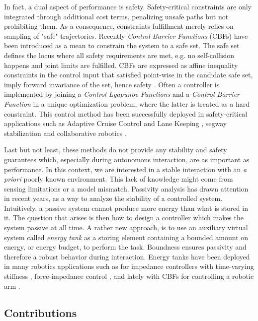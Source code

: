 In fact, a dual aspect of performance is safety. Safety-critical constraints are only integrated through additional cost terms, penalizing unsafe paths but not prohibiting them. As a consequence, constraints fulfillment merely relies on sampling of "safe" trajectories. 
Recently \emph{Control Barrier Functions} (CBFs) have been introduced as a mean to constrain the system to a safe set. The safe set defines the locus where all safety requirements are met, e.g. no self-collision happens and joint limits are fulfilled. CBFs are expressed as affine inequality constraints in the control input that satisfied point-wise in the candidate safe set, imply forward invariance of the set, hence safety \cite{ames2016control}.  Often a controller is implemented by joining a \emph{Control Lyapunov Functions} and a \emph{Control Barrier Function} in a unique optimization problem, where the latter is treated as a hard constraint. This control method has been successfully deployed in safety-critical applications such as Adaptive Cruise Control and Lane Keeping \cite{vahidi2003research}, segway stabilization \cite{gurriet2018towards} and collaborative robotics \cite{benzi2021optimization}.

Last but not least, these methods do not provide any stability and safety guarantees which, especially during autonomous interaction, are as important as performance. In this context, we are interested in a stable interaction with an \emph{a priori} poorly known environment. This lack of knowledge might come from sensing limitations or a model mismatch. Passivity analysis has drawn attention in recent years, as a way to analyze the stability of a controlled system. Intuitively, a passive system cannot produce more energy than what is stored in it. The question that arises is then how to design a controller which makes the system passive at all time. A rather new approach, is to use an auxiliary virtual system called \emph{energy tank} as a storing element containing a bounded amount on energy, or energy budget, to perform the task. Boundness ensures passivity \cite{secchi2019energy} and therefore a robust behavior during interaction. Energy tanks have been deployed in many robotics applications such as for impedance controllers with time-varying stiffness \cite{schindlbeck2015unified}, force-impedance control \cite{shahriari2018valve}, and lately with CBFs for controlling a robotic arm \cite{benzi2021optimization}.

\subsection{Contributions}

